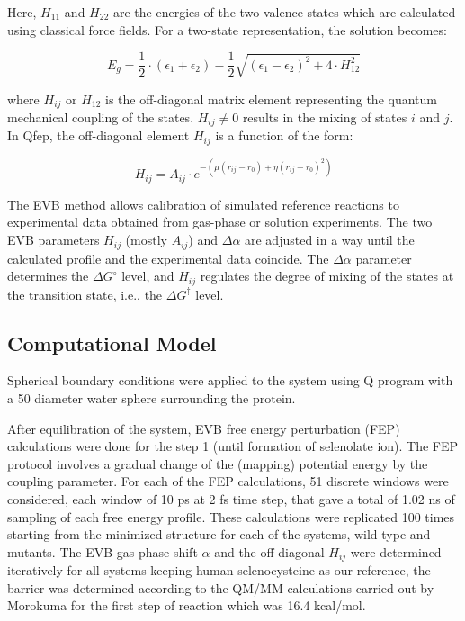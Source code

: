 \documentclass[journal=jacsat,manuscript=article]{achemso}
\begin{document}
Here, \(H_{11}\) and \(H_{22}\) are the energies of the two valence states which are calculated using classical force fields. 
For a two-state representation, the solution becomes:

\begin{equation}
    E_g = \frac{1}{2} \cdot \left( \epsilon_1 + \epsilon_2 \right) - \frac{1}{2} \sqrt{ \left( \epsilon_1 - \epsilon_2 \right)^2 + 4 \cdot H_{12}^2 }
\end{equation}

where \(H_{ij}\) or \(H_{12}\) is the off-diagonal matrix element representing the quantum mechanical coupling of the states. \(H_{ij} \neq 0\) results in the mixing of states \(i\) and \(j\). In Qfep, the off-diagonal element \(H_{ij}\) is a function of the form:

\begin{equation}
    H_{ij} = A_{ij} \cdot e^{-(\mu (r_{ij} - r_0) + \eta (r_{ij} - r_0)^2)}
\end{equation}

The EVB method allows calibration of simulated reference reactions to experimental data obtained from gas-phase or solution experiments. The two EVB parameters \(H_{ij}\) (mostly \(A_{ij}\)) and \(\Delta \alpha\) are adjusted in a way until the calculated profile and the experimental data coincide. The \(\Delta \alpha\) parameter determines the \(\Delta G^\circ\) level, and \(H_{ij}\) regulates the degree of mixing of the states at the transition state, i.e., the \(\Delta G^\ddagger\) level.

\subsection{Computational Model}

Spherical boundary conditions \cite{King1989} were applied to the system using Q program \cite{Marelius1999} with a 50 \text{\AA} diameter water sphere surrounding the protein.

After equilibration of the system, EVB free energy perturbation (FEP) calculations were done for the step 1 (until formation of selenolate ion). The FEP protocol involves a gradual change of the (mapping) potential energy by the coupling parameter. For each of the FEP calculations, 51 discrete windows were considered, each window of 10 ps at 2 fs time step, that gave a total of 1.02 ns of sampling of each free energy profile. These calculations were replicated 100 times starting from the minimized structure for each of the systems, wild type and mutants. The EVB gas phase shift $\alpha$ and the off-diagonal \(H_{ij}\) were determined iteratively for all systems keeping human selenocysteine as our reference, the barrier was determined according to the QM/MM calculations carried out by Morokuma \cite{Prabhakar2006} for the first step of reaction which was 16.4 kcal/mol.

\medskip



\end{document}

